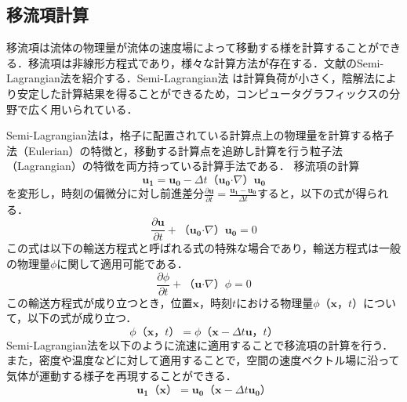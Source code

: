 \documentclass[a4j,12pt]{jreport}
\begin{document}

\subsection{移流項計算}
移流項は流体の物理量が流体の速度場によって移動する様を計算することができる．移流項は非線形方程式であり，様々な計算方法が存在する．文献\cite{fedkiw}のSemi-Lagrangian法を紹介する．Semi-Lagrangian法
は計算負荷が小さく，陰解法により安定した計算結果を得ることができるため，コンピュータグラフィックスの分野で広く用いられている．

Semi-Lagrangian法は，格子に配置されている計算点上の物理量を計算する格子法（Eulerian）の特徴と，移動する計算点を追跡し計算を行う粒子法（Lagrangian）の特徴を両方持っている計算手法である．
移流項の計算$$\bm{u_1} = \bm{u_0}  - \varDelta t （\bm{u_0}  \boldsymbol{\cdot}\nabla） \bm{u_0}$$を変形し，時刻の偏微分に対し前進差分$\frac{\partial \bm{u}}{\partial t} = \frac{\bm{u_1} - \bm{u_0}}{ \varDelta t }$すると，以下の式が得られる．
\[
\frac{\partial \bm{u}}{\partial t}   +（\bm{u_0}  \boldsymbol{\cdot}\nabla） \bm{u_0} = 0
\]
この式は以下の輸送方程式と呼ばれる式の特殊な場合であり，輸送方程式は一般の物理量$\phi$に関して適用可能である．
\begin{equation}\label{eq:transfer}
	\frac{\partial {\phi}}{\partial t}  +（\bm{u}  \boldsymbol{\cdot}\nabla） {\phi} = 0
\end{equation} 
この輸送方程式が成り立つとき，位置$\bm{x}$，時刻$t$における物理量$\phi（\bm{x}，t）$について，以下の式が成り立つ．
\begin{equation}\label{eq:semi-Lagrangian}
	{\phi}（\bm{x}，t） = {\phi}（\bm{x}  - \varDelta t \bm{u}，t）
\end{equation} 
Semi-Lagrangian法を以下のように流速に適用することで移流項の計算を行う．また，密度や温度などに対して適用することで，空間の速度ベクトル場に沿って気体が運動する様子を再現することができる．
\begin{equation}
	\bm{u_1}（\bm{x}） = \bm{u_0}（\bm{x}  - \varDelta t \bm{u_0}）
\end{equation}
\end{document}
